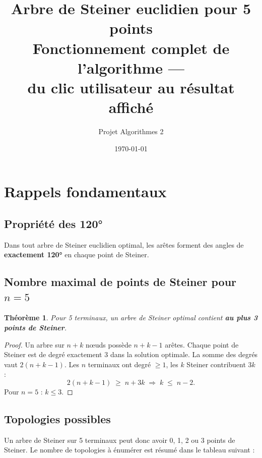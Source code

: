 \documentclass[12pt, a4paper]{article}
\title{
    \textbf{Arbre de Steiner euclidien pour 5 points}\\[0.4em]
    \large Fonctionnement complet de l'algorithme —\\
    du clic utilisateur au résultat affiché
}
\author{Projet Algorithmes 2}
\date{\today}
\newtheorem{theoreme}{Théorème}
\begin{document}
\maketitle
\tableofcontents
\newpage

\section{Rappels fondamentaux}

\subsection{Propriété des 120°}

Dans tout arbre de Steiner euclidien optimal, les arêtes forment des angles
de \textbf{exactement 120°} en chaque point de Steiner.

\subsection{Nombre maximal de points de Steiner pour $n = 5$}

\begin{theoreme}
Pour 5 terminaux, un arbre de Steiner optimal contient \textbf{au plus 3 points de Steiner}.
\end{theoreme}

\begin{proof}
Un arbre sur $n + k$ nœuds possède $n + k - 1$ arêtes.
Chaque point de Steiner est de degré exactement 3 dans la solution optimale.
La somme des degrés vaut $2(n + k - 1)$.
Les $n$ terminaux ont degré $\geq 1$, les $k$ Steiner contribuent $3k$ :
\[
    2(n + k - 1) \;\geq\; n + 3k
    \;\Longrightarrow\; k \;\leq\; n - 2.
\]
Pour $n = 5$ : $k \leq 3$.
\end{proof}

\subsection{Topologies possibles}

Un arbre de Steiner sur 5 terminaux peut donc avoir 0, 1, 2 ou 3 points de Steiner.
Le nombre de topologies à énumérer est résumé dans le tableau suivant :
\end{document}
